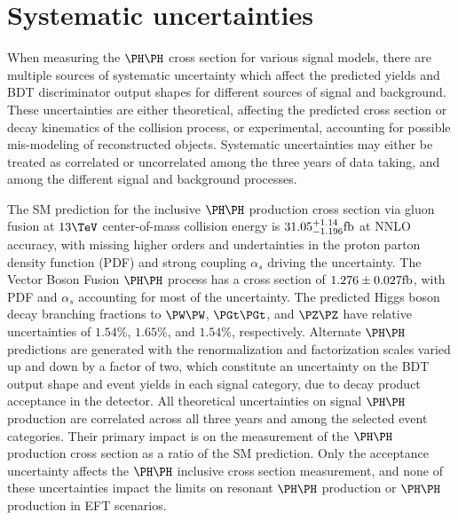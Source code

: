 \section{Systematic uncertainties}
\label{sec:systematicUncertainties}

When measuring the $\HH$ cross section for various signal models,
there are multiple sources of systematic uncertainty which affect
the predicted yields and BDT discriminator output shapes for different
sources of signal and background.
These uncertainties are either theoretical, affecting the predicted cross
section or decay kinematics of the collision process, or experimental,
accounting for possible mis-modeling of reconstructed objects.
Systematic uncertainties may either be treated as correlated or
uncorrelated among the three years of data taking, and among the
different signal and background processes.

The SM prediction for the inclusive $\HH$ production cross section
via gluon fusion at $13\TeV$ center-of-mass collision energy is
$31.05^{+1.14}_{-1.196}\text{fb}$ at NNLO accuracy, with missing higher
orders and undertainties in the proton parton density function (PDF)
and strong coupling $\alpha_{s}$ driving the uncertainty. %
The Vector Boson Fusion $\HH$ process has a cross section of
$1.276\pm0.027\text{fb}$, with PDF and $\alpha_{s}$ accounting for most of
the uncertainty. %
The predicted Higgs boson decay branching fractions to $\PW\PW$,
$\PGt\PGt$, and $\PZ\PZ$ have relative uncertainties of $1.54\%$,
$1.65\%$, and $1.54\%$, respectively. %
Alternate $\HH$ predictions are generated with the renormalization
and factorization scales varied up and down by a factor of two, which
constitute an uncertainty on the BDT output shape and event yields
in each signal category, due to decay product acceptance in the detector.
All theoretical uncertainties on signal $\HH$ production are correlated
across all three years and among the selected event categories.
Their primary impact is on the measurement of the $\HH$ production
cross section as a ratio of the SM prediction.
Only the acceptance uncertainty affects the $\HH$ inclusive cross
section measurement, and none of these uncertainties impact the
limits on resonant $\HH$ production or $\HH$ production in EFT scenarios.

